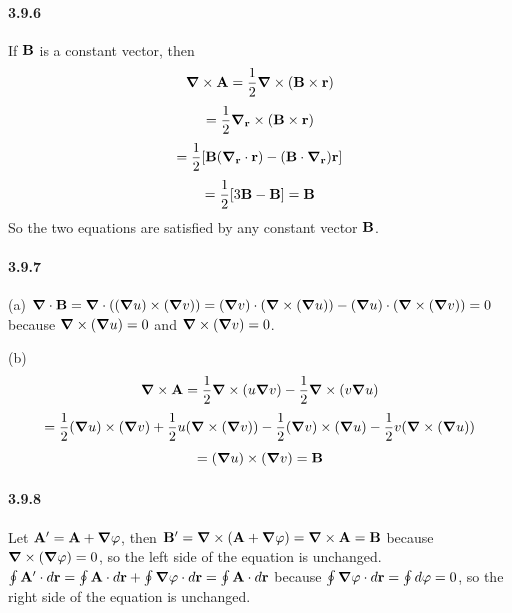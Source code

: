 \documentclass[a4paper]{article}
\begin{document}
\paragraph{3.9.6}
If $\V{B}$ is a constant vector, then
\[
\del\times\V{A}=\frac{1}{2}\del\times(\V{B}\times\V{r})\]
\[=\frac{1}{2}\del_\V{r}\times(\V{B}\times\V{r})
\]
\[
=\frac{1}{2}[\V{B}(\del_\V{r}\cdot\V{r})-(\V{B}\cdot\del_\V{r})\V{r}]
\]
\[
=\frac{1}{2}[3\V{B}-\V{B}]=\V{B}
\]
So the two equations are satisfied by any constant vector $\V{B}$.

\paragraph{3.9.7}
(a) $\del\cdot\V{B}=\del\cdot((\del u)\times(\del v))=(\del v)\cdot(\del\times(\del u))-(\del u)\cdot(\del\times(\del v))=0$ because $\del\times(\del u)=0$ and $\del\times(\del v)=0$.
\medskip

(b) 
\[
\del\times\V{A}=\frac{1}{2}\del\times(u\del v)-\frac{1}{2}\del\times(v\del u)
\]
\[
=\frac{1}{2}(\del u)\times(\del v)+\frac{1}{2}u(\del\times(\del v))-\frac{1}{2}(\del v)\times(\del u)-\frac{1}{2}v(\del\times(\del u))
\]
\[
=(\del u)\times(\del v)=\V{B}
\]

\paragraph{3.9.8}
Let $\V{A}'=\V{A}+\del\varphi$, then $\V{B}'=\del\times(\V{A}+\del\varphi)=\del\times\V{A}=\V{B}$ because $\del\times(\del\varphi)=0$, so the left side of the equation is unchanged. $\oint\V{A}'\cdot d\V{r}=\oint \V{A}\cdot d\V{r}+\oint\del\varphi\cdot d\V{r}=\oint \V{A}\cdot d\V{r}$ because $\oint\del\varphi\cdot d\V{r}=\oint d\varphi=0$, so the right side of the equation is unchanged.
\end{document}
